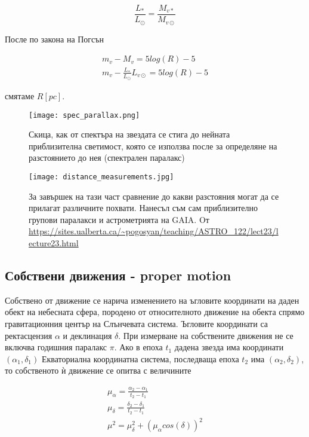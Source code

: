 \documentclass[a4paper,12pt]{article}
\begin{document}
\begin{equation}
    \frac{L_*}{L_\odot} = \frac{M_{v*}}{M_{v \odot}}
\end{equation}

После по закона на Погсън

\begin{gather}
    m_v - M_v = 5 log(R) - 5\\
    m_v - \frac{L_*}{L_\odot} L_{v \odot} = 5 log(R) - 5
\end{gather}

смятаме $R[pc]$.

\begin{figure}[h!]
\centering
\texttt{[image: spec\_parallax.png]}
\caption{Скица, как от спектъра на звездата се стига до нейната приблизителна светимост, която се използва после за определяне на разстоянието до нея (спектрален паралакс)}
\label{fig:spec_parallax}
\end{figure}


\begin{figure}[h!]
\centering
\texttt{[image: distance\_measurements.jpg]}
\caption{За завършек на тази част сравнение до какви разстояния могат да се прилагат различните похвати. Нанесъл съм сам приблизително групови паралакси и астрометрията на GAIA. Oт \url{https://sites.ualberta.ca/~pogosyan/teaching/ASTRO_122/lect23/lecture23.html}}
\label{fig:distance_measurements}
\end{figure}


\subsection{Собствени движения - proper motion}
Собствено от движение се нарича изменението на ъгловите координати на даден обект на небесната сфера, породено от относителното движение на обекта спрямо гравитационния център на Слънчевата система. Ъгловите координати са  ректасцензия $\alpha$ и деклинация $\delta$. При измерване на собствените движения не се включва годишния паралакс $\pi$.  Ако в епоха $t_1$ дадена звезда има координати $(\alpha_1, \delta_1)$ Екваториална координатна система, последваща епоха $t_2$ има $(\alpha_2, \delta_2)$, то собственото ѝ движение се опитва с величините



\begin{gather}
    \mu_\alpha = \frac{\alpha_2 - \alpha_1}{t_2 - t_1}\\
    \mu_\delta = \frac{\delta_2 - \delta_1}{t_2 - t_1}\\
    \mu^2 = \mu_\delta^2 + (\mu_\alpha cos(\delta))^2
\end{gather}
\end{document}
